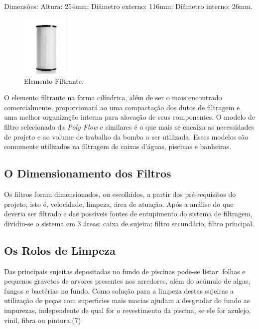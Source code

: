 \begin{description}
Dimensões: Altura: 254mm; Diâmetro externo: 116mm; Diâmetro interno: 26mm.
\par
  \begin{figure}[h]
    \centering
    \includegraphics[width=0.2\textwidth]{figures/filter.png}
    \caption{Elemento Filtrante.}
    \label{fig:filter}
  \end{figure}
  \FloatBarrier
\par
O elemento filtrante na forma cilíndrica, além de ser o mais encontrado comercialmente, proporcionará ao \cpr uma compactação dos dutos de filtragem e uma melhor organização interna para alocação de seus componentes. O modelo de filtro selecionado da \textit{Poly Flow} e similares é o que mais se encaixa as necessidades de projeto e ao volume de trabalho da bomba a ser utilizada. Esses modelos são comumente utilizados na filtragem de caixas d’águas, piscinas e banheiras.
\end{description}

\subsection{O Dimensionamento dos Filtros}
Os filtros foram dimensionados, ou escolhidos, a partir dos pré-requisitos do projeto, isto é, velocidade, limpeza, área de atuação. Após a análise do que deveria ser filtrado e das possíveis fontes de entupimento do sistema de filtragem, dividiu-se o sistema em 3 áreas: caixa de sujeira; filtro secundário; filtro principal. 

\subsection{Os Rolos de Limpeza}
Das principais sujeitas depositadas no fundo de piscinas pode-se listar: folhas e pequenos gravetos de arvores presentes nos arredores, além do acúmulo de algas, fungos e bactérias no fundo. Como solução para a limpeza destas sujeiras a utilização de peças com superficies mais macias ajudam a desgrudar do fundo as impurezas, independente de qual for o revestimento da piscina, se ele for azulejo, vinil, fibra ou pintura.(7)

